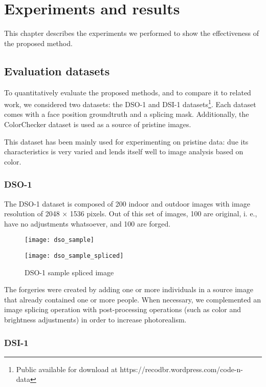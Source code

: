 \chapter{Experiments and results}

This chapter describes the experiments we performed to show the effectiveness of the proposed method. 

\section{Evaluation datasets}
To quantitatively evaluate the proposed methods, and to compare it to related work,
we considered two datasets: the DSO-1 and DSI-1 datasets\footnote{Public available for download at https://recodbr.wordpress.com/code-n-data}. Each dataset comes with a face position groundtruth and a splicing mask. Additionally, the ColorChecker dataset \cite{gehler2008bayesian} is used as a source of pristine images.

This dataset has been mainly used for experimenting on pristine data: due its characteristics is very varied and lends itself well to image analysis based on color.

\subsection{DSO-1}

The DSO-1 dataset is composed of 200 indoor and outdoor images with image resolution of 2048 × 1536 pixels. Out of this set of images, 100 are original, i. e., have no adjustments whatsoever, and 100 are forged. 

\begin{figure}[!htb]
  \texttt{[image: dso\_sample]}
  \caption{DSO-1 sample original image}\label{fig:dsooriginalimage}
\endminipage\hfill
{}
  \texttt{[image: dso\_sample\_spliced]}
  \caption{DSO-1 sample spliced image}\label{fig:dsosplicedimage}
\endminipage
\end{figure}

The forgeries were created by adding one or more individuals in a source image that already contained one or more people. When necessary, we complemented an image splicing operation with post-processing operations (such as color and brightness adjustments) in order to increase photorealism.

\subsection{DSI-1}

